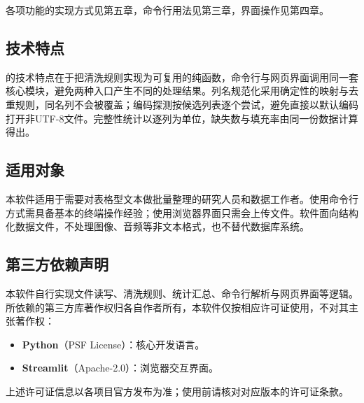 各项功能的实现方式见第五章，命令行用法见第三章，界面操作见第四章。

\subsection{技术特点}
\label{ssec:technical_features}
\Name{}的技术特点在于把清洗规则实现为可复用的纯函数，命令行与网页界面调用同一套核心模块，避免两种入口产生不同的处理结果。列名规范化采用确定性的映射与去重规则，同名列不会被覆盖；编码探测按候选列表逐个尝试，避免直接以默认编码打开非UTF-8文件。完整性统计以逐列为单位，缺失数与填充率由同一份数据计算得出。

\subsection{适用对象}
\label{ssec:intro_audience}
本软件适用于需要对表格型文本做批量整理的研究人员和数据工作者。使用命令行方式需具备基本的终端操作经验；使用浏览器界面只需会上传文件。软件面向结构化数据文件，不处理图像、音频等非文本格式，也不替代数据库系统。

\subsection{第三方依赖声明}
\label{ssec:third_party}
本软件自行实现文件读写、清洗规则、统计汇总、命令行解析与网页界面等逻辑。所依赖的第三方库著作权归各自作者所有，本软件仅按相应许可证使用，不对其主张著作权：
\begin{itemize}
    \item \textbf{Python}（PSF License）：核心开发语言。
    \item \textbf{Streamlit}（Apache-2.0）：浏览器交互界面。
\end{itemize}
上述许可证信息以各项目官方发布为准；使用前请核对对应版本的许可证条款。
